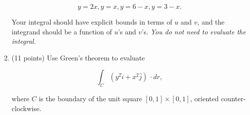 \documentclass[12 pt]{report}
\begin{document}
\begin{enumerate}
\[
y = 2x, y = x, y = 6-x, y = 3-x.
\]

Your integral should have explicit bounds in terms of $u$ and $v$, and the integrand should be a function of $u$'s and $v$'s. \emph{You do not need to evaluate the integral.}

\vfill 

\newpage


\item (11 points) Use Green's theorem to evaluate

\[
\int_C (y^2 \hat{i} + x^2 \hat{j}) \, \cdot dr,
\]

where $C$ is the boundary of the unit square $[0,1] \times [0,1]$, oriented counter-clockwise. 

\vfill


\end{enumerate}
\end{document}
